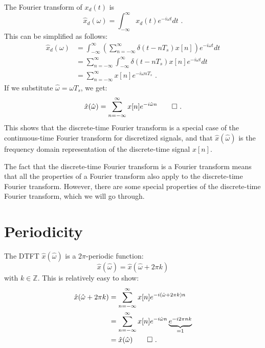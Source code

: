 The Fourier transform of $x_d(t)$ is
\begin{equation}
\hat{x}_d(\omega) = \int_{-\infty}^{\infty} x_d(t) e^{-i\omega t}dt\,\,.
\label{ctft}
\end{equation}
This can be simplified as follows:
\begin{align}
\hat{x}_d(\omega)&=\int_{-\infty}^{\infty} \left(\sum_{n=-\infty}^{\infty} \delta(t- nT_s) x[n]\right) e^{-i\omega t}dt \\
&=\sum_{n=-\infty}^{\infty} \int_{-\infty}^{\infty} \delta(t-nT_s) x[n] e^{-i\omega t}dt \\
&= \sum_{n=-\infty}^{\infty} x[n] e^{- i \omega n T_s}\label{eq:dtftd1}\,\,.
\end{align}
If we substitute $\hat{\omega}=\omega T_s$, we get:
\begin{equation}
\hat{x}(\hat{\omega}) = \sum_{n=-\infty}^{\infty} x[n] e^{- i \hat{\omega} n}\qed\,\,.
\end{equation}
This shows that the discrete-time
Fourier transform is a special case of the continuous-time Fourier
transform for discretized signals, and that $\hat{x}(\hat{\omega})$ is
the frequency domain representation of the discrete-time signal
$x[n]$.

The fact that the discrete-time Fourier transform is a Fourier
transform means that all the properties of a Fourier transform also
apply to the discrete-time Fourier transform. However, there are some
special properties of the discrete-time Fourier transform, which we
will go through.

\section{Periodicity}

The DTFT $\hat{x}(\hat{\omega})$ is a $2\pi$-periodic function:
\begin{equation}
\boxed{
\hat{x}(\hat{\omega})=\hat{x}(\hat{\omega}+2\pi k)
}
\end{equation}
with $k \in \mathbb{Z}$. This is relatively easy to show:
\begin{align}
\hat{x}(\hat{\omega}+2\pi k) &= \sum_{n=-\infty}^{\infty} x[n]e^{-i(\hat{\omega}+2\pi k)n}\\
& = \sum_{n=-\infty}^{\infty} x[n]e^{-i\hat{\omega}n} \underbrace{e^{-i 2\pi nk}}_{=1} \\
& = \hat{x}(\hat{\omega})\qed\,\,. 
\end{align}

